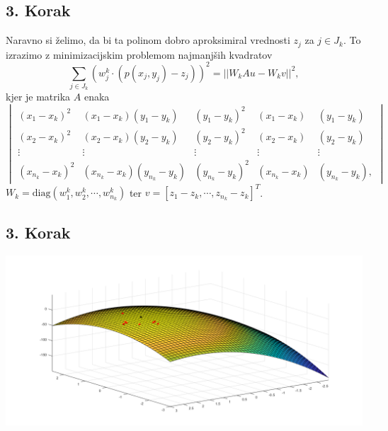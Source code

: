 \documentclass[ignorenonframetext]{beamer}
\let\frametitle\subsection %
\begin{document}
\begin{frame}
\frametitle{3. Korak}
Naravno si želimo, da bi ta polinom dobro aproksimiral vrednosti $z_j$ za $j \in J_k$. 
To izrazimo z minimizacijskim problemom najmanjših kvadratov
$$\sum_{j \in J_k} (w^k_j \cdot (p(x_j,y_j) - z_j))^2 = ||W_kAu - W_kv||^2,$$
kjer je matrika $A$ enaka
\begin{equation*}
\begin{vmatrix}
(x_1 - x_k)^2 &  (x_1 - x_k) (y_1 - y_k) & (y_1 - y_k)^2 & (x_1 - x_k) & (y_1 - y_k) \\
(x_2 - x_k)^2 &  (x_2 - x_k) (y_2 - y_k) & (y_2 - y_k)^2 & (x_2 - x_k) & (y_2 - y_k) \\
\vdots & \vdots & \vdots & \vdots & \vdots \\
(x_{n_k} - x_k)^2 & (x_{n_k} - x_k) (y_{n_k} - y_k) & (y_{n_k} - y_k)^2 & (x_{n_k} - x_k) & (y_{n_k} - y_k),
\end{vmatrix}
\end{equation*}
$W_k = \text{diag}(w^k_1, w^k_2, \cdots, w^k_{n_k})$ ter $v = [z_1 - z_k, \cdots, z_{n_k} - z_k]^T$.
\end{frame}

\begin{frame}
\frametitle{3. Korak}
\includegraphics[width=\textwidth, height=\textheight]{slike/surfInterpol.png}
\end{frame}
\end{document}
